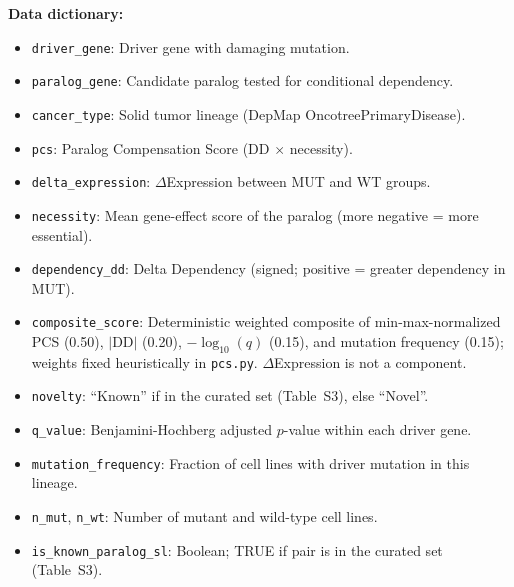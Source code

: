 \documentclass[11pt,a4paper]{article}
\begin{document}
\textbf{Data dictionary:}
\begin{itemize}\setlength\itemsep{0pt}
\item \texttt{driver\_gene}: Driver gene with damaging mutation.
\item \texttt{paralog\_gene}: Candidate paralog tested for conditional dependency.
\item \texttt{cancer\_type}: Solid tumor lineage (DepMap OncotreePrimaryDisease).
\item \texttt{pcs}: Paralog Compensation Score (DD $\times$ necessity).
\item \texttt{delta\_expression}: $\Delta$Expression between MUT and WT groups.
\item \texttt{necessity}: Mean gene-effect score of the paralog (more negative = more essential).
\item \texttt{dependency\_dd}: Delta Dependency (signed; positive = greater dependency in MUT).
\item \texttt{composite\_score}: Deterministic weighted composite of min-max-normalized PCS (0.50), $|$DD$|$ (0.20), $-\log_{10}(q)$ (0.15), and mutation frequency (0.15); weights fixed heuristically in \texttt{pcs.py}. $\Delta$Expression is not a component.
\item \texttt{novelty}: ``Known'' if in the curated set (Table~S3), else ``Novel''.
\item \texttt{q\_value}: Benjamini-Hochberg adjusted $p$-value within each driver gene.
\item \texttt{mutation\_frequency}: Fraction of cell lines with driver mutation in this lineage.
\item \texttt{n\_mut}, \texttt{n\_wt}: Number of mutant and wild-type cell lines.
\item \texttt{is\_known\_paralog\_sl}: Boolean; TRUE if pair is in the curated set (Table~S3).
\end{itemize}
\end{document}
